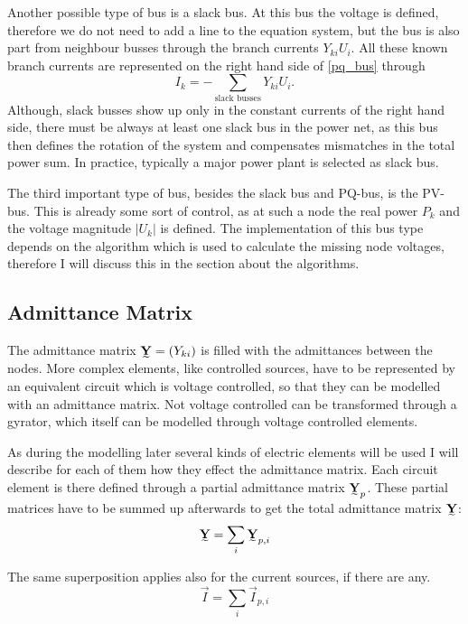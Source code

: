 Another possible type of bus is a slack bus. At this bus the voltage is defined, therefore we do not need to add a line to the equation system, but the bus is also part from neighbour busses through the branch currents $Y_{ki} U_i$. All these known branch currents are represented on the right hand side of \eqref{pq_bus} through
\begin{equation}
	I_k = -\sum_{\text{slack busses}} Y_{ki} U_i.
\end{equation}
Although, slack busses show up only in the constant currents of the right hand side, there must be always at least one slack bus in the power net, as this bus then defines the rotation of the system and compensates mismatches in the total power sum. In practice, typically a major power plant is selected as slack bus.

The third important type of bus, besides the slack bus and PQ-bus, is the PV-bus. This is already some sort of control, as at such a node the real power $P_k$ and the voltage magnitude $|U_k|$ is defined. The implementation of this bus type depends on the algorithm which is used to calculate the missing node voltages, therefore I will discuss this in the section about the algorithms.

\subsection{Admittance Matrix}

The admittance matrix $\mat Y = (Y_{ki})$ is filled with the admittances between the nodes. More complex elements, like controlled sources, have to be represented by an equivalent circuit which is voltage controlled, so that they can be modelled with an admittance matrix. Not voltage controlled can be transformed through a gyrator, which itself can be modelled through voltage controlled elements.

As during the modelling later several kinds of electric elements will be used I will describe for each of them how they effect the admittance matrix. Each circuit element is there defined through a partial admittance matrix $\mat Y_p$. These partial matrices have to be summed up afterwards to get the total admittance matrix $\mat Y$:
\begin{equation}
	\mat Y = \sum_i \mat Y_{p,i}
\end{equation}

The same superposition applies also for the current sources, if there are any.
\begin{equation}
	\vec I = \sum_i \vec I_{p,i}
\end{equation}

